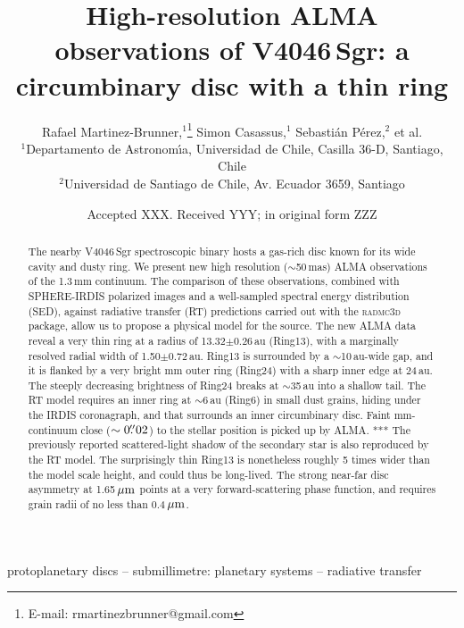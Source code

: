 \documentclass[letters,usenatbib,times]{mnras}
\title[High-resolution ALMA observations of V4046\,Sgr]{High-resolution ALMA observations of V4046\,Sgr: a circumbinary disc with a thin ring}
\author[R. Martinez Brunner et al.]{
Rafael Martinez-Brunner,$^{1}$\thanks{E-mail: rmartinezbrunner@gmail.com}
Simon Casassus,$^{1}$
Sebasti\'an P\'erez,$^{2}$
et al. 
\\
$^{1}$Departamento de Astronom\'{\i}a, Universidad de Chile, Casilla 36-D, Santiago, Chile\\
$^{2}$Universidad de Santiago de Chile, Av. Ecuador 3659, Santiago\\
}
\date{Accepted XXX. Received YYY; in original form ZZZ}
\begin{document}
\label{firstpage}
\pagerange{\pageref{firstpage}--\pageref{lastpage}}
\maketitle

\begin{abstract}
  The nearby V4046\,Sgr spectroscopic binary hosts a gas-rich disc known for its wide cavity and dusty ring. We present new high resolution ($\sim$50\,mas) ALMA observations of the 1.3\,mm continuum. The comparison of these observations, combined with SPHERE-IRDIS polarized images and a well-sampled spectral energy distribution (SED), against radiative transfer (RT) predictions carried out with the \textsc{radmc3d} package, allow us to propose a physical model for the source. The new ALMA data reveal a very thin ring at a radius of 13.32$\pm$0.26\,au (Ring13), with a marginally resolved radial width of 1.50$\pm$0.72\,au. Ring13 is surrounded by a $\sim$10\,au-wide gap, and it is flanked by a very bright mm outer ring (Ring24) with a sharp inner edge at 24\,au. The steeply decreasing brightness of Ring24 breaks at $\sim$35\,au into a shallow tail. The RT model requires an inner ring at $\sim$6\,au (Ring6) in small dust grains, hiding under the IRDIS coronagraph, and that surrounds an inner circumbinary disc. Faint mm-continuum close ($\sim0\hbox{$.\!\!^{\prime\prime}$}02$) to the stellar position is picked up by ALMA. ***
  The previously reported scattered-light shadow of the secondary star is also reproduced by the RT model. The surprisingly thin Ring13 is nonetheless roughly 5 times wider than the model scale height, and could thus be long-lived. The strong near-far disc asymmetry at 1.65\,$\hbox{$\mu$m}$ points at a very forward-scattering phase function, and requires grain radii of no less than 0.4\,$\hbox{$\mu$m}$. 
\end{abstract}

\begin{keywords}
 protoplanetary discs -- submillimetre: planetary systems -- radiative transfer
\end{keywords}


\end{document}
